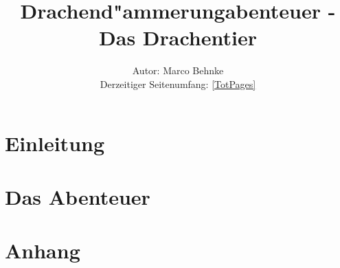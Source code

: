 

\title{Drachend"ammerungabenteuer -\\Das Drachentier}
\author{Autor: Marco Behnke\\
      Derzeitiger Seitenumfang: \ref{TotPages}
      }


        \sffamily
        \frontmatter
                \maketitle\newpage
                \tableofcontents
        
        \mainmatter
                \part{Einleitung}
            
                \part{Das Abenteuer}
            
            
            
            
            
            
            
                \part{Anhang}
                        \appendix
            
            
            
            
            

